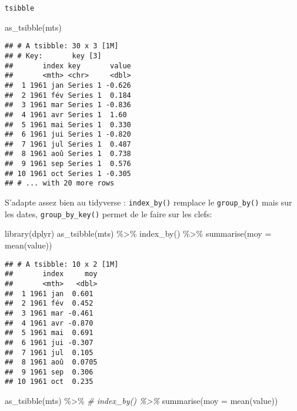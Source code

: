 \documentclass[10pt,xcolor=table,color={dvipsnames,usenames},ignorenonframetext,usepdftitle=false,french]{beamer}
\newenvironment{Shaded}{\begin{snugshade}}{\end{snugshade}}
\newcommand{\AttributeTok}[1]{\textcolor[rgb]{0.77,0.63,0.00}{#1}}
\newcommand{\CommentTok}[1]{\textcolor[rgb]{0.56,0.35,0.01}{\textit{#1}}}
\newcommand{\FunctionTok}[1]{\textcolor[rgb]{0.00,0.00,0.00}{#1}}
\newcommand{\NormalTok}[1]{#1}
\newcommand{\SpecialCharTok}[1]{\textcolor[rgb]{0.00,0.00,0.00}{#1}}
\begin{document}
\begin{frame}{\texttt{tsibble}}
\begin{Shaded}
\begin{Highlighting}[]
\FunctionTok{as\_tsibble}\NormalTok{(mts)}
\end{Highlighting}
\end{Shaded}

\begin{verbatim}
## # A tsibble: 30 x 3 [1M]
## # Key:       key [3]
##       index key       value
##       <mth> <chr>     <dbl>
##  1 1961 jan Series 1 -0.626
##  2 1961 fév Series 1  0.184
##  3 1961 mar Series 1 -0.836
##  4 1961 avr Series 1  1.60 
##  5 1961 mai Series 1  0.330
##  6 1961 jui Series 1 -0.820
##  7 1961 jul Series 1  0.487
##  8 1961 aoû Series 1  0.738
##  9 1961 sep Series 1  0.576
## 10 1961 oct Series 1 -0.305
## # ... with 20 more rows
\end{verbatim}

S'adapte assez bien au tidyverse : \texttt{index\_by()} remplace le
\texttt{group\_by()} mais sur les dates, \texttt{group\_by\_key()}
permet de le faire sur les clefs:

\begin{Shaded}
\begin{Highlighting}[]
\FunctionTok{library}\NormalTok{(dplyr)}
\FunctionTok{as\_tsibble}\NormalTok{(mts) }\SpecialCharTok{\%\textgreater{}\%}  
    \FunctionTok{index\_by}\NormalTok{() }\SpecialCharTok{\%\textgreater{}\%} 
    \FunctionTok{summarise}\NormalTok{(}\AttributeTok{moy =} \FunctionTok{mean}\NormalTok{(value))}
\end{Highlighting}
\end{Shaded}

\begin{verbatim}
## # A tsibble: 10 x 2 [1M]
##       index     moy
##       <mth>   <dbl>
##  1 1961 jan  0.601 
##  2 1961 fév  0.452 
##  3 1961 mar -0.461 
##  4 1961 avr -0.870 
##  5 1961 mai  0.691 
##  6 1961 jui -0.307 
##  7 1961 jul  0.105 
##  8 1961 aoû  0.0705
##  9 1961 sep  0.306 
## 10 1961 oct  0.235
\end{verbatim}

\begin{Shaded}
\begin{Highlighting}[]
\FunctionTok{as\_tsibble}\NormalTok{(mts) }\SpecialCharTok{\%\textgreater{}\%}  
    \CommentTok{\# index\_by() \%\textgreater{}\% }
    \FunctionTok{summarise}\NormalTok{(}\AttributeTok{moy =} \FunctionTok{mean}\NormalTok{(value))}
\end{Highlighting}
\end{Shaded}


\end{frame}
\end{document}
